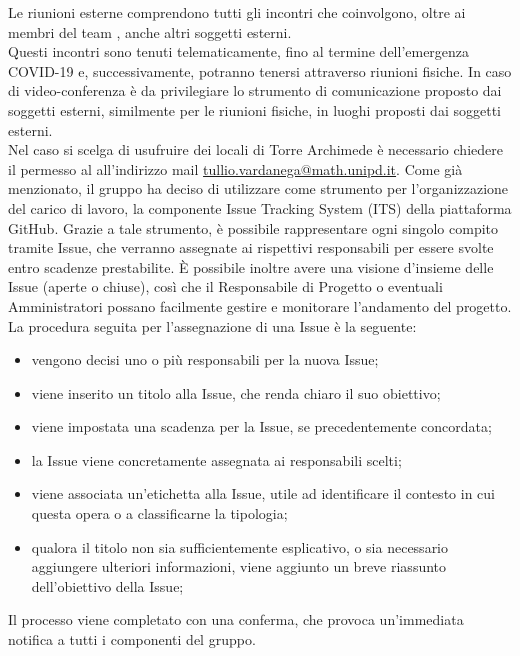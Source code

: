 				Le riunioni esterne comprendono tutti gli incontri che coinvolgono, oltre ai membri del team \Gruppo{}, anche altri soggetti esterni.\\
				Questi incontri sono tenuti telematicamente, fino al termine dell'emergenza COVID-19 e, successivamente, potranno tenersi attraverso riunioni fisiche. In caso di video-conferenza è da privilegiare lo strumento di comunicazione proposto dai soggetti esterni, similmente per le riunioni fisiche, in luoghi proposti dai soggetti esterni.\\
				Nel caso si scelga di usufruire dei locali di Torre Archimede è necessario chiedere il permesso al \TV{} all'indirizzo mail \href{mailto:tullio.vardanega@math.unipd.it}{tullio.vardanega@math.unipd.it}.
			Come già menzionato, il gruppo ha deciso di utilizzare come strumento per l'organizzazione del carico di lavoro, la componente Issue Tracking System (ITS) della piattaforma GitHub. Grazie a tale strumento, è possibile rappresentare ogni singolo compito tramite Issue, che verranno assegnate ai rispettivi responsabili per essere svolte entro scadenze prestabilite. È possibile inoltre avere una visione d'insieme delle Issue (aperte o chiuse), così che il Responsabile di Progetto o eventuali Amministratori possano facilmente gestire e monitorare l'andamento del progetto.
			La procedura seguita per l'assegnazione di una Issue è la seguente:
			\begin{itemize}
				\item vengono decisi uno o più responsabili per la nuova Issue;
				\item viene inserito un titolo alla Issue, che renda chiaro il suo obiettivo;
				\item viene impostata una scadenza per la Issue, se precedentemente concordata;
				\item la Issue viene concretamente assegnata ai responsabili scelti;
				\item viene associata un'etichetta alla Issue, utile ad identificare il contesto in cui questa opera o a classificarne la tipologia;
				\item qualora il titolo non sia sufficientemente esplicativo, o sia necessario aggiungere ulteriori informazioni, viene aggiunto un breve riassunto dell'obiettivo della Issue;
			\end{itemize}
			Il processo viene completato con una conferma, che provoca un'immediata notifica a tutti i componenti del gruppo.

